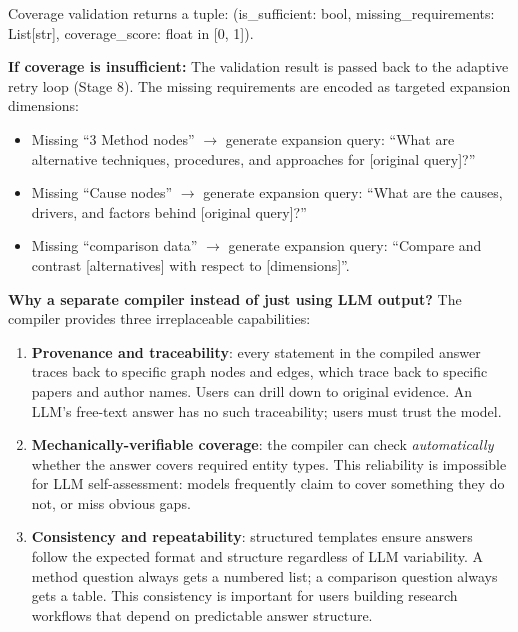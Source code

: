 \documentclass[11pt]{article}
\begin{document}
Coverage validation returns a tuple: (is\_sufficient: bool, missing\_requirements: List[str], coverage\_score: float in [0, 1]). 

\textbf{If coverage is insufficient:} The validation result is passed back to the adaptive retry loop (Stage 8). The missing requirements are encoded as targeted expansion dimensions:
\begin{itemize}[leftmargin=1.2em]
  \item Missing ``3 Method nodes'' $\rightarrow$ generate expansion query: ``What are alternative techniques, procedures, and approaches for [original query]?''
  \item Missing ``Cause nodes'' $\rightarrow$ generate expansion query: ``What are the causes, drivers, and factors behind [original query]?''
  \item Missing ``comparison data'' $\rightarrow$ generate expansion query: ``Compare and contrast [alternatives] with respect to [dimensions]''.
\end{itemize}

\textbf{Why a separate compiler instead of just using LLM output?} The compiler provides three irreplaceable capabilities:
\begin{enumerate}[leftmargin=1.2em]
  \item \textbf{Provenance and traceability}: every statement in the compiled answer traces back to specific graph nodes and edges, which trace back to specific papers and author names. Users can drill down to original evidence. An LLM's free-text answer has no such traceability; users must trust the model.
  
  \item \textbf{Mechanically-verifiable coverage}: the compiler can check \emph{automatically} whether the answer covers required entity types. This reliability is impossible for LLM self-assessment: models frequently claim to cover something they do not, or miss obvious gaps.
  
  \item \textbf{Consistency and repeatability}: structured templates ensure answers follow the expected format and structure regardless of LLM variability. A method question always gets a numbered list; a comparison question always gets a table. This consistency is important for users building research workflows that depend on predictable answer structure.
\end{enumerate}

\end{document}
